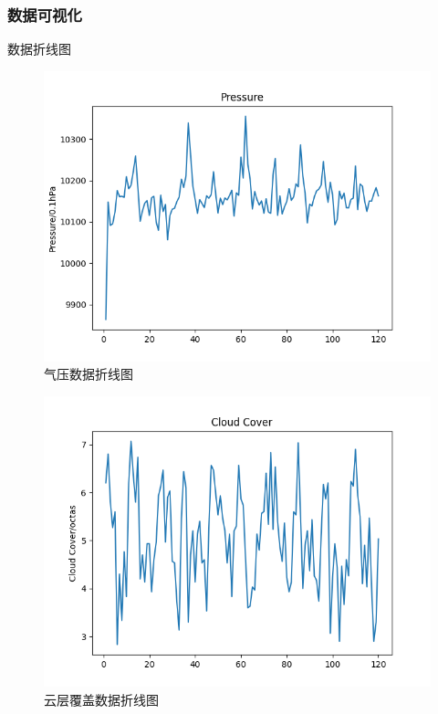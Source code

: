 \documentclass[10pt]{beamer}
\begin{document}
\begin{frame}
	\frametitle{数据可视化}
	\begin{block}{数据折线图}
		\begin{figure}[h!]
			\centering
			\includegraphics[scale=0.21]{../src/prepare_data/pp.png}
			\caption{气压数据折线图}
		\end{figure}

		\begin{figure}[h!]
			\centering
			\includegraphics[scale=0.21]{../src/prepare_data/cc.png}
			\caption{云层覆盖数据折线图}
		\end{figure}
	\end{block}
\end{frame}
\end{document}
